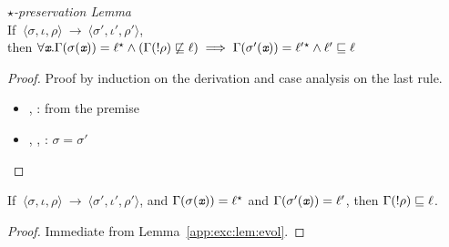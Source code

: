 \begin{myLemma}{\emph{$\star$-preservation Lemma}}\\
\label{app:exc:lem:evol}
If $~\langle \sigma, \iota, \rho \rangle~ \rightarrow
~\langle \sigma', \iota', \rho' \rangle$, \\
then $\forall
 \emph{\texttt{x}}. \Gamma(\sigma(\emph{\texttt{x}})) = \ell{}^\star \wedge
 (\Gamma(!\rho) 
 \not\sqsubseteq \ell) \implies \Gamma(\sigma'(\emph{\texttt{x}})) = 
  \ell' {}^\star   \wedge \ell' \sqsubseteq \ell$
\end{myLemma}
\begin{proof}
Proof by induction on the derivation and case analysis on the last
rule.
\begin{itemize}
\item {}, : from the premise
\item {}, , : $\sigma = \sigma'$
\end{itemize}
\end{proof}

\begin{mycor}
\label{app:exc:cor:cor1}
If $~\langle \sigma, \iota, \rho \rangle~ \rightarrow
~\langle \sigma', \iota', \rho' \rangle$, and
$\Gamma(\sigma(\emph{\texttt{x}})) = \ell{}^\star $ and
$\Gamma(\sigma'(\emph{\texttt{x}})) = \ell'$, then 
$\Gamma(!\rho) \sqsubseteq \ell$.
\end{mycor}
\begin{proof}
Immediate from Lemma~\ref{app:exc:lem:evol}.
\end{proof}

